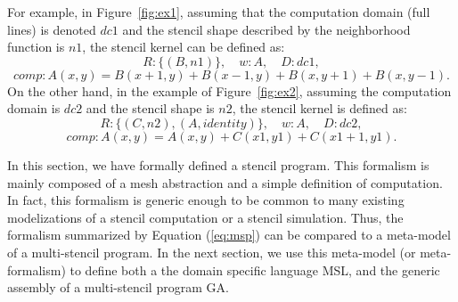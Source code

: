 For example, in Figure~\ref{fig:ex1}, assuming that the computation domain (full lines) is denoted $dc1$ and the stencil shape described by the neighborhood function is $n1$, the stencil kernel can be defined as:
\begin{equation*}
R: \{(B,n1)\}, \quad w: A, \quad D: dc1,
\end{equation*}
\begin{equation*}
comp: A(x,y)=B(x+1,y)+B(x-1,y)+B(x,y+1)+B(x,y-1).
\end{equation*}
On the other hand, in the example of Figure~\ref{fig:ex2}, assuming the computation domain is $dc2$ and the stencil shape is $n2$, the stencil kernel is defined as:
\begin{equation*}
R: \{(C,n2),(A,identity)\}, \quad w: A, \quad D: dc2,
\end{equation*}
\begin{equation*}
comp: A(x,y)=A(x,y)+C(x1,y1)+C(x1+1,y1).
\end{equation*}

In this section, we have formally defined a stencil program. This formalism is mainly composed of a mesh abstraction and a simple definition of computation. In fact, this formalism is generic enough to be common to many existing modelizations of a stencil computation or a stencil simulation. Thus, the formalism summarized by Equation (\ref{eq:msp}) can be compared to a meta-model of a multi-stencil program. In the next section, we use this meta-model (or meta-formalism) to define both a the domain specific language MSL, and the generic assembly of a multi-stencil program GA.

